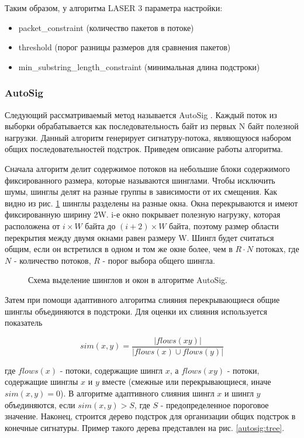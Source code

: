 Таким образом, у алгоритма LASER 3 параметра настройки:
\begin{itemize}
    \item packet\_constraint (количество пакетов в потоке)
    \item threshold (порог разницы размеров для сравнения пакетов)
    \item min\_substring\_length\_constraint (минимальная длина подстроки)
\end{itemize}

\subsubsection{AutoSig}

Следующий рассматриваемый метод называется AutoSig \cite{ye2009autosig, santosautomatic}.
Каждый поток из выборки обрабатывается как последовательность байт из первых N байт полезной нагрузки.
Данный алгоритм генерирует сигнатуру-потока, являющуюся набором общих последовательностей подстрок.
Приведем описание работы алгоритма.

Сначала алгоритм делит содержимое потоков на небольшие блоки содержимого фиксированного размера, которые называются шинглами.
Чтобы исключить шумы, шинглы делят на разные группы в зависимости от их смещения. Как видно из рис. \ref{autosig:shingles} шинглы разделены на разные окна.
Окна перекрываются и имеют фиксированную ширину 2W. i-е окно покрывает полезную нагрузку, которая расположена от $i \times W$ байта до $(i+2) \times W$ байта,
поэтому размер области перекрытия между двумя окнами равен размеру W. Шингл будет считаться общим, если он встретился в одном и том же окне более, чем в $R \cdot N$ потоках,
где $N$ - количество потоков, $R$ - порог выбора общего шингла.

\begin{figure}[h!]
    \begin{center}
        
        \caption{Схема выделение шинглов и окон в алгоритме AutoSig.}\label{autosig:shingles}
    \end{center}
\end{figure}

Затем при помощи адаптивного алгоритма слияния перекрывающиеся общие шинглы объединяются в подстроки.
Для оценки их слияния используется показатель

$$ sim(x, y) = \frac{|flows(xy)|}{|flows(x) \cup flows(y)|} $$

где $flows(x)$ - потоки, содержащие шингл $x$, а $flows(xy)$ - потоки, содержащие шинглы $x$ и $y$ вместе (смежные или перекрывающиеся, иначе $sim(x, y) = 0$).
В алгоритме адаптивного слияния шингл $x$ и шингл $y$ объединяются, если $sim(x, y)>S$, где $S$ - предопределенное пороговое значение.
Наконец, строится дерево подстрок для организации общих подстрок в конечные сигнатуры. Пример такого дерева представлен на рис. \ref{autosig:tree}.

